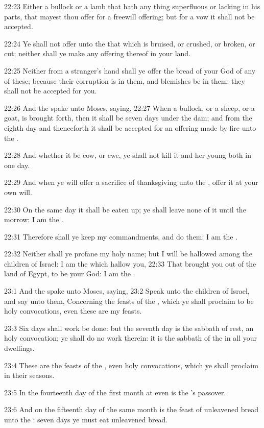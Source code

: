 22:23 Either a bullock or a lamb that hath any thing superfluous or lacking in his parts, that mayest thou offer for a freewill offering; but for a vow it shall not be accepted.

22:24 Ye shall not offer unto the \LORD that which is bruised, or crushed, or broken, or cut; neither shall ye make any offering thereof in your land.

22:25 Neither from a stranger's hand shall ye offer the bread of your God of any of these; because their corruption is in them, and blemishes be in them: they shall not be accepted for you.

22:26 And the \LORD spake unto Moses, saying, 22:27 When a bullock, or a sheep, or a goat, is brought forth, then it shall be seven days under the dam; and from the eighth day and thenceforth it shall be accepted for an offering made by fire unto the \LORD.

22:28 And whether it be cow, or ewe, ye shall not kill it and her young both in one day.

22:29 And when ye will offer a sacrifice of thanksgiving unto the \LORD, offer it at your own will.

22:30 On the same day it shall be eaten up; ye shall leave none of it until the morrow: I am the \LORD.

22:31 Therefore shall ye keep my commandments, and do them: I am the \LORD.

22:32 Neither shall ye profane my holy name; but I will be hallowed among the children of Israel: I am the \LORD which hallow you, 22:33 That brought you out of the land of Egypt, to be your God: I am the \LORD.

23:1 And the \LORD spake unto Moses, saying, 23:2 Speak unto the children of Israel, and say unto them, Concerning the feasts of the \LORD, which ye shall proclaim to be holy convocations, even these are my feasts.

23:3 Six days shall work be done: but the seventh day is the sabbath of rest, an holy convocation; ye shall do no work therein: it is the sabbath of the \LORD in all your dwellings.

23:4 These are the feasts of the \LORD, even holy convocations, which ye shall proclaim in their seasons.

23:5 In the fourteenth day of the first month at even is the \LORD's passover.

23:6 And on the fifteenth day of the same month is the feast of unleavened bread unto the \LORD: seven days ye must eat unleavened bread.

